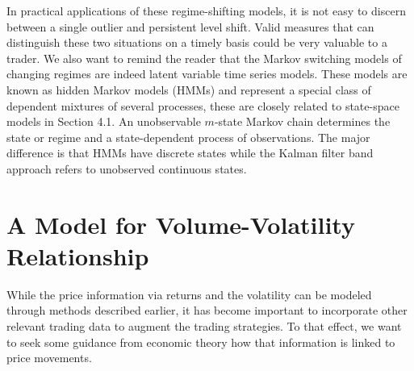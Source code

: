 In practical applications of these regime-shifting models, it is not easy to discern between a single outlier and persistent level shift. Valid measures that can distinguish these two situations on a timely basis could be very valuable to a trader. We also want to remind the reader that the Markov switching models of changing regimes are indeed latent variable time series models. These models are known as hidden Markov models (HMMs) and represent a special class of dependent mixtures of several processes, these are closely related to state-space models in Section 4.1. An unobservable $m$-state Markov chain determines the state or regime and a state-dependent process of observations. The major difference is that HMMs have discrete states while the Kalman filter band approach refers to unobserved continuous states. 


\section{A Model for Volume-Volatility Relationship}


While the price information via returns and the volatility can be modeled through methods described earlier, it has become important to incorporate other relevant trading data to augment the trading strategies. To that effect, we want to seek some guidance from economic theory how that information is linked to price movements.

